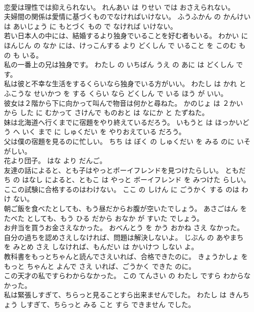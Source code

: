 \documentclass[8pt]{extreport}
\begin{document}
\begin{CJK}{UTF8}{min}
\\	恋愛は理性では抑えられない。	れんあい は りせい では おさえられない。	
\\	夫婦間の関係は愛情に基づくものでなければいけない。	ふうふかん の かんけい は あいじょう に もとづく もの で なければ いけない。	
\\	若い日本人の中には、結婚するより独身でいることを好む者もいる。	わかい にほんじん の なか には、けっこんする より どくしん で いること を このむ もの も いる。	
\\	私の一番上の兄は独身です。	わたし の いちばん うえ の あに は どくしん です。	
\\	私は彼と不幸な生活をするくらいなら独身でいる方がいい。	わたし は かれ と ふこうな せいかつ を する くらい なら どくしん で いる ほう が いい。	
\\	彼女は２階から下に向かって叫んで物音は何かと尋ねた。	かのじょ は ２かい から した に むかって さけんで ものおと は なにか と たずねた。	
\\	妹は北海道へ行くまでに宿題をやり終えているだろう。	いもうと は ほっかいどう へ いく まで に しゅくだい を やりおえている だろう。	
\\	父は僕の宿題を見るのに忙しい。	ちち は ぼく の しゅくだい を みる のに いそがしい。	
\\	花より団子。	はな より だんご。	
\\	友達の話によると、とも子はやっとボーイフレンドを見つけたらしい。	ともだち の はなし によると、ともこ は やっと ボーイフレンド を みつけた らしい。	
\\	ここの試験に合格するのはわけない。	ここ の しけん に ごうかく する のは わけ ない。	
\\	朝ご飯を食べたとしても、もう昼だからお腹が空いたでしょう。	あさごはん を たべた としても、もう ひる だから おなか が すいた でしょう。	
\\	お弁当を買うお金さえなかった。	おべんとう を かう おかね さえ なかった。	
\\	自分の過ちを認めさえしなければ、問題は解決しないよ。	じぶん の あやまち を みとめ さえ しなければ、もんだい は かいけつ しない よ。	
\\	教科書をもっとちゃんと読んでさえいれば、合格できたのに。	きょうかしょ を もっと ちゃんと よんで さえ いれば、ごうかく できた のに。	
\\	この天才の私ですらわからなかった。	この てんさい の わたし ですら わからなかった。	
\\	私は緊張しすぎて、ちらっと見ることすら出来ませんでした。	わたし は きんちょう しすぎて、ちらっと みる こと すら できません でした。	

\end{CJK}
\end{document}
